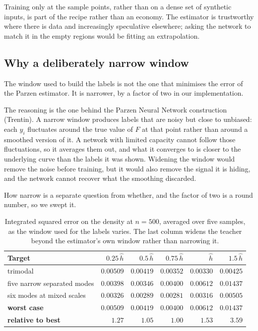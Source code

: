 \documentclass[11pt]{article}
\newcommand{\hhat}{\hat{h}}
\begin{document}
Training only at the sample points, rather than on a dense set of synthetic inputs, is part
of the recipe rather than an economy. The estimator is trustworthy where there is data and
increasingly speculative elsewhere; asking the network to match it in the empty regions would
be fitting an extrapolation.

\subsection{Why a deliberately narrow window}
\label{sec:teacher-window}

The window used to build the labels is not the one that minimises the error of the Parzen
estimator. It is narrower, by a factor of two in our implementation.

The reasoning is the one behind the Parzen Neural Network construction (Trentin). A narrow
window produces labels that are noisy but close to unbiased: each $y_i$ fluctuates around the
true value of $F$ at that point rather than around a smoothed version of it. A network with
limited capacity cannot follow those fluctuations, so it averages them out, and what it
converges to is closer to the underlying curve than the labels it was shown. Widening the
window would remove the noise before training, but it would also remove the signal it is
hiding, and the network cannot recover what the smoothing discarded.

How narrow is a separate question from whether, and the factor of two is a round number, so
we swept it.

\begin{table}[H]
\centering
\begin{tabular}{@{}lrrrrr@{}}
\toprule
\textbf{Target} & $0.25\,\hhat$ & $0.5\,\hhat$ & $0.75\,\hhat$ & $\hhat$ & $1.5\,\hhat$ \\
\midrule
trimodal & $0.00509$ & $0.00419$ & $0.00352$ & $\mathbf{0.00330}$ & $0.00425$ \\
five narrow separated modes & $0.00398$ & $\mathbf{0.00346}$ & $0.00400$ & $0.00612$ &
  $0.01437$ \\
six modes at mixed scales & $0.00326$ & $0.00289$ & $\mathbf{0.00281}$ & $0.00316$ &
  $0.00505$ \\
\midrule
\textbf{worst case} & $0.00509$ & $0.00419$ & $\mathbf{0.00400}$ & $0.00612$ & $0.01437$ \\
\textbf{relative to best} & $1.27$ & $1.05$ & $\mathbf{1.00}$ & $1.53$ & $3.59$ \\
\bottomrule
\end{tabular}
\caption{Integrated squared error on the density at $n = 500$, averaged over five samples,
as the window used for the labels varies. The last column widens the teacher beyond the
estimator's own window rather than narrowing it.}
\label{tab:teacher}
\end{table}
\end{document}
